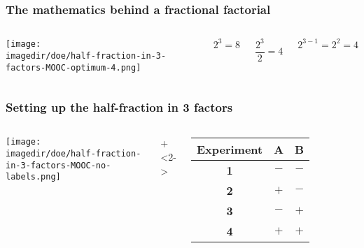 \documentclass[handout,11pt,aspectratio=169,mathserif]{beamer}
\begin{document}
\begin{frame}\frametitle{The mathematics behind a fractional factorial}
	\begin{columns}
			\begin{center}
				\texttt{[image: \\imagedir/doe/half-fraction-in-3-factors-MOOC-optimum-4.png]}
			\end{center}
			
			{\fontsize{1cm}{2em}\selectfont  $2^3 = 8$}
	
			\pause
			\vspace{1cm}
			{\fontsize{1cm}{2em}\selectfont  $\dfrac{2^3}{2} = 4$}
	
			\pause
			\vspace{1cm}
			{\fontsize{1cm}{2em}\selectfont  $2^{3-1} = 2^2 = 4$}
	\end{columns}	

\end{frame}

\begin{frame}\frametitle{Setting up the half-fraction in 3 factors}
	\begin{columns}
		\column{0.65\textwidth}
			\begin{center}
				\texttt{[image: \\imagedir/doe/half-fraction-in-3-factors-MOOC-no-labels.png]}
			\end{center}
			
		\onslide+<2->	{
		\column{0.55\textwidth}
			\begin{tabulary}{\linewidth}{|c||c|c|}\hline 
				\textsf{\relax Experiment } & \textbf{\relax A } & \textbf{\relax B } \\ %
				\hline \textbf{1} & \(-\) & \(-\) \\%
				\hline \textbf{2} & \(+\) & \(-\) \\%
				\hline \textbf{3} & \(-\) & \(+\) \\%
				\hline \textbf{4} & \(+\) & \(+\) \\%
				\hline
			\end{tabulary}
		}
	\end{columns}	
\end{frame}
\end{document}
